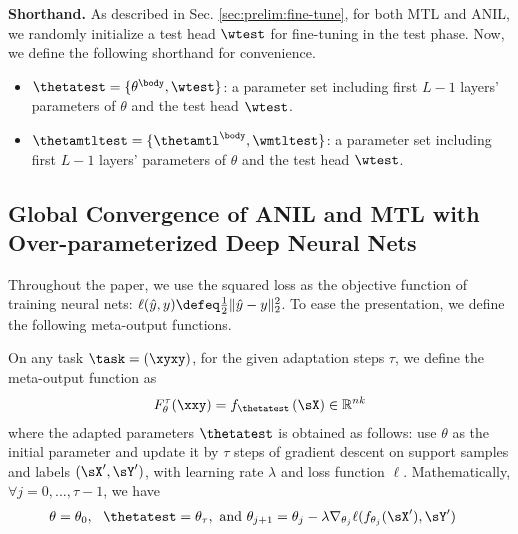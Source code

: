 \documentclass{article}
\begin{document}
\textbf{Shorthand.} As described in Sec. \ref{sec:prelim:fine-tune}, for both MTL and ANIL, we randomly initialize a test head $\wtest$ for fine-tuning in the test phase. Now, we define the following shorthand for convenience.
\begin{itemize}
    \item $\thetatest = \{\theta^\body, \wtest\}$: a parameter set including first $L-1$ layers' parameters of $\theta$ and the test head $\wtest$. 
\item $\thetamtltest = \{\thetamtl^\body, \wmtltest\}$: a parameter set including first $L-1$ layers' parameters of $\theta$ and the test head $\wtest$.
\end{itemize}
















\subsection{Global Convergence of ANIL and MTL with Over-parameterized Deep Neural Nets}\label{supp:proof:global-convergence}
Throughout the paper, we use the squared loss as the objective function of training neural nets: $\ell (\hat y, y)\defeq\frac{1}{2}\|\hat y - y\|_2^2$. To ease the presentation, we define the following meta-output functions.
\begin{definition} On any task $\task = (\xyxy)$, for the given adaptation steps $\tau$, we define the meta-output function as 
     \begin{align}
        \label{eq:meta-output}
        F^\tau_\theta(\xxy) = f_{\thetatest}\left(\sX\right) \in \mathbb R^{n k}
        \end{align}
        where the adapted parameters $\thetatest$ is obtained as follows: 
        use $\theta$ as the initial parameter and update it by $\tau$ steps of gradient descent on support samples and labels $(\sX',\sY')$, with learning rate $\lambda$ and loss function $\ell$. Mathematically, $\forall j=0,...,\tau-1$, we have
        \begin{align}\label{eq:meta-adaption-descrete}
            &\theta=\theta_0, ~~\thetatest=\theta_\tau, \text{ and }\theta_{j+1} = \theta_{j} - \lambda \nabla_{\theta_{j}} \ell(f_{\theta_j}(\sX'),\sY')
        \end{align}
\end{definition}
\end{document}
